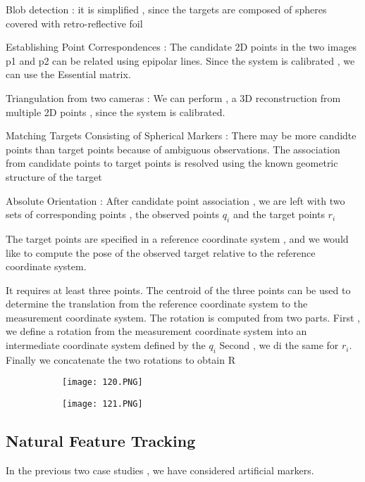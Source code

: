 \documentclass{article}
\begin{document}
Blob detection : it is simplified , since the targets are composed of spheres covered with retro-reflective foil

Establishing Point Correspondences : The candidate 2D points in the two images p1 and p2 can be related using epipolar lines. Since the system is calibrated , we can use the Essential matrix.

Triangulation from two cameras : We can perform , a 3D reconstruction from multiple 2D points , since the system is calibrated.

Matching Targets Consisting of Spherical Markers : There may be more candidte points than target points because of ambiguous observations. The association from candidate points to target points is resolved using the known geometric structure of the target

Absolute Orientation : After candidate point association , we are left with two sets of corresponding points , the observed points $q_i$ and the target points $r_i$

The target points are specified in a reference coordinate system , and we would like to compute the pose of the observed target relative to the reference coordinate system.

It requires at least three points.
The centroid of the three points can be used to determine the translation from the reference coordinate system to the measurement coordinate system.
The rotation is computed from two parts.
First , we define a rotation from the measurement coordinate system into an intermediate coordinate system defined by the $q_i$
Second , we di the same for $r_i$. Finally we concatenate the two rotations to obtain R

\begin{figure}[ht!]
  \centering
  \begin{subfigure}[b]{0.4\linewidth}
    \texttt{[image: 120.PNG]}
  \end{subfigure}
  \begin{subfigure}[b]{0.4\textwidth}
         \centering
         \texttt{[image: 121.PNG]}
     \end{subfigure}
\end{figure}


\subsection{Natural Feature Tracking}

In the previous two case studies , we have considered artificial markers.
\end{document}
